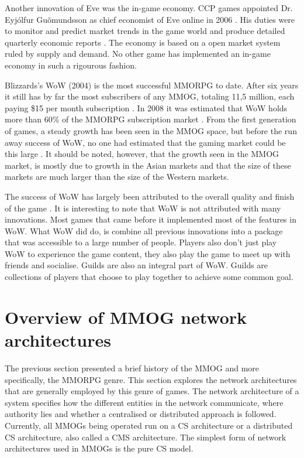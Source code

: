 \documentclass[journal,oneside,a4paper,onecolumn]{IEEEtran}
\begin{document}
Another innovation of Eve was the in-game economy. CCP games appointed Dr. Eyj\'{o}lfur Gu\~{o}mundsson as chief economist of Eve online in 2006 \cite{eve_economist}. His duties were to monitor and predict market trends in the game world and produce detailed quarterly economic reports \cite{eve_econ_rep}.  The economy is based on a open market system ruled by supply and demand. No other game has implemented an in-game economy in such a rigourous fashion.

Blizzards's \ac{WoW} (2004) is the most successful MMORPG to date. After six years it still has by far the most subscribers of any MMOG, totaling 11,5 million, each paying \$15 per month subscription \cite{wow_subscibers}. In 2008 it was estimated that WoW holds more than 60\% of the MMORPG subscription market \cite{mmog_sub_market}. From the first generation of games, a steady growth has been seen in the MMOG space, but before the run away success of WoW, no one had estimated that the gaming market could be this large \cite{mmog_growth_analysis}. It should be noted, however, that the growth seen in the \ac{MMOG} market, is mostly due to growth in the Asian markets and that the size of these markets are much larger than the size of the Western markets.

The success of \ac{WoW} has largely been attributed to the overall quality and finish of the game \cite{wow_csf}. It is interesting to note that WoW is not attributed with many innovations. Most games that came before it implemented most of the features in WoW. What WoW did do, is combine all previous innovations into a package that was accessible to a large number of people.  Players also don't just play WoW to experience the game content, they also play the game to meet up with friends and socialise. Guilds are also an integral part of WoW. Guilds are collections of players that choose to play together to achieve some common goal.

\section{Overview of MMOG network architectures}

The previous section presented a brief history of the \ac{MMOG} and more specifically, the \ac{MMORPG} genre. This section explores the network architectures that are generally employed by this genre of games. The network architecture of a system specifies how the different entities in the network communicate, where authority lies and whether a centralised or distributed approach is followed. Currently, all MMOGs being operated run on a \ac{CS} architecture or a distributed \ac{CS} architecture, also called a \ac{CMS} architecture. The simplest form of network architectures used in MMOGs is the pure \ac{CS} model.
\end{document}
